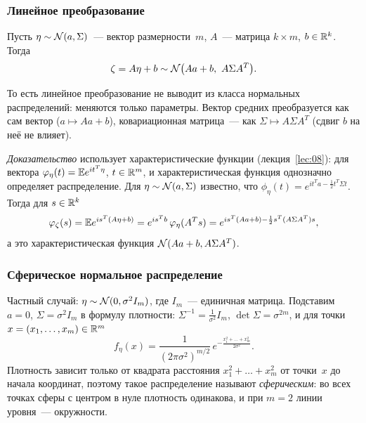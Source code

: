 \subsubsection{Линейное преобразование}

\begin{lemma}
  \label{lec09:linear}
  Пусть $\eta \sim \mathcal{N}(a, \Sigma)$~--- вектор размерности~$m$, $A$~--- матрица $k \times m$,
  $b \in \mathbb{R}^k$. Тогда
  \[
    \zeta = A\eta + b \sim \mathcal{N}\bigl(Aa + b,\ A \Sigma A^T\bigr).
  \]
\end{lemma}

То есть линейное преобразование не выводит из класса нормальных распределений: меняются
только параметры. Вектор средних преобразуется как сам вектор ($a \mapsto Aa + b$),
ковариационная матрица~--- как $\Sigma \mapsto A \Sigma A^T$ (сдвиг $b$ на неё не влияет).

\begin{addendum}
  \emph{Доказательство} \cite[гл.~16, лемма~2.1]{bure} использует характеристические функции
  (лекция~\ref{lec:08}): для вектора $\varphi_\eta(t) = \mathbb{E} e^{i t^T \eta}$, $t \in \mathbb{R}^m$, и
  характеристическая функция однозначно определяет распределение. Для $\eta \sim \mathcal{N}(a, \Sigma)$
  известно, что $\phi_\eta(t) = e^{i t^T a - \frac12 t^T \Sigma t}$. Тогда для $s \in \mathbb{R}^k$
  \[
    \varphi_\zeta(s) = \mathbb{E} e^{i s^T (A\eta + b)} = e^{i s^T b}\, \varphi_\eta(A^T s)
    = e^{i s^T (Aa + b) - \frac12 s^T (A \Sigma A^T) s},
  \]
  а это характеристическая функция $\mathcal{N}(Aa + b, A\Sigma A^T)$.
\end{addendum}

\subsubsection{Сферическое нормальное распределение}

Частный случай: $\eta \sim \mathcal{N}(0, \sigma^2 I_m)$, где $I_m$~--- единичная матрица.
Подставим $a = 0$, $\Sigma = \sigma^2 I_m$ в формулу плотности: $\Sigma^{-1} = \frac{1}{\sigma^2} I_m$,
$\det\Sigma = \sigma^{2m}$, и для точки $x = (x_1, \ldots, x_m) \in \mathbb{R}^m$
\[
  f_\eta(x) = \frac{1}{(2\pi\sigma^2)^{m/2}}\, e^{-\frac{x_1^2 + \ldots + x_m^2}{2\sigma^2}}.
\]
Плотность зависит только от квадрата расстояния $x_1^2 + \ldots + x_m^2$ от точки~$x$ до
начала координат, поэтому такое распределение называют \emph{сферическим}: во всех точках
сферы с центром в нуле плотность одинакова, и при $m = 2$ линии уровня~--- окружности.

